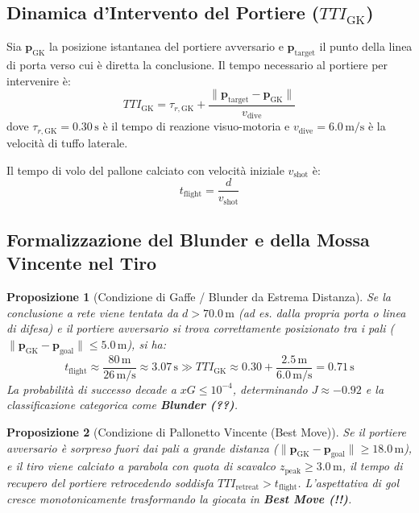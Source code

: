 \documentclass[11pt,a4paper]{article}
\newtheorem{proposizione}{Proposizione}[section]
\begin{document}
\subsection{Dinamica d'Intervento del Portiere ($TTI_{\text{GK}}$)}
Sia $\mathbf{p}_{\text{GK}}$ la posizione istantanea del portiere avversario e $\mathbf{p}_{\text{target}}$ il punto della linea di porta verso cui è diretta la conclusione. Il tempo necessario al portiere per intervenire è:
\begin{equation}
TTI_{\text{GK}} = \tau_{r, \text{GK}} + \frac{\|\mathbf{p}_{\text{target}} - \mathbf{p}_{\text{GK}}\|}{v_{\text{dive}}}
\end{equation}
dove $\tau_{r, \text{GK}} = 0.30\,\text{s}$ è il tempo di reazione visuo-motoria e $v_{\text{dive}} = 6.0\,\text{m/s}$ è la velocità di tuffo laterale.

Il tempo di volo del pallone calciato con velocità iniziale $v_{\text{shot}}$ è:
\begin{equation}
t_{\text{flight}} = \frac{d}{v_{\text{shot}}}
\end{equation}

\subsection{Formalizzazione del Blunder e della Mossa Vincente nel Tiro}
\begin{proposizione}[Condizione di Gaffe / Blunder da Estrema Distanza]
Se la conclusione a rete viene tentata da $d > 70.0\,\text{m}$ (ad es. dalla propria porta o linea di difesa) e il portiere avversario si trova correttamente posizionato tra i pali ($\|\mathbf{p}_{\text{GK}} - \mathbf{p}_{\text{goal}}\| \le 5.0\,\text{m}$), si ha:
\begin{equation}
t_{\text{flight}} \approx \frac{80\,\text{m}}{26\,\text{m/s}} \approx 3.07\,\text{s} \gg TTI_{\text{GK}} \approx 0.30 + \frac{2.5\,\text{m}}{6.0\,\text{m/s}} = 0.71\,\text{s}
\end{equation}
La probabilità di successo decade a $xG \le 10^{-4}$, determinando $J \approx -0.92$ e la classificazione categorica come \textbf{Blunder (??)}.
\end{proposizione}

\begin{proposizione}[Condizione di Pallonetto Vincente (Best Move)]
Se il portiere avversario è sorpreso fuori dai pali a grande distanza ($\|\mathbf{p}_{\text{GK}} - \mathbf{p}_{\text{goal}}\| \ge 18.0\,\text{m}$), e il tiro viene calciato a parabola con quota di scavalco $z_{\text{peak}} \ge 3.0\,\text{m}$, il tempo di recupero del portiere retrocedendo soddisfa $TTI_{\text{retreat}} > t_{\text{flight}}$. L'aspettativa di gol cresce monotonicamente trasformando la giocata in \textbf{Best Move (!!)}.
\end{proposizione}
\end{document}
